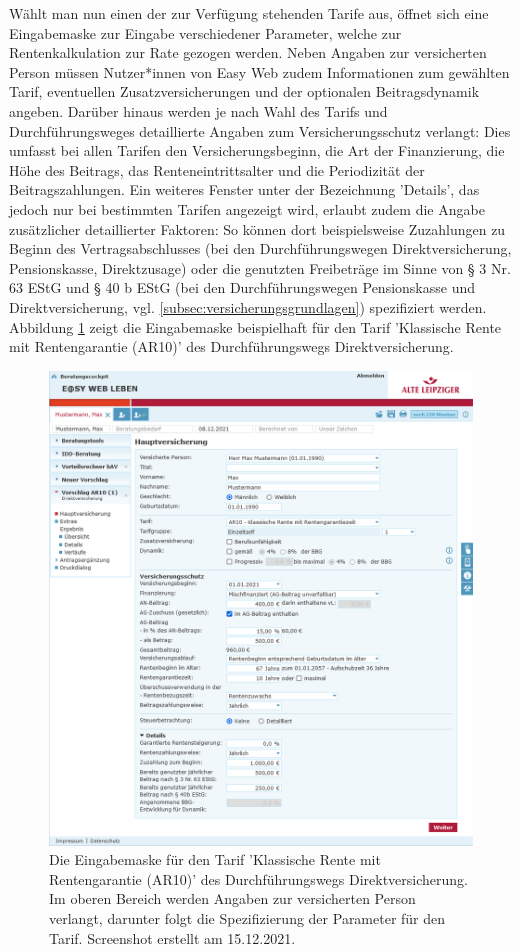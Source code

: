 Wählt man nun einen der zur Verfügung stehenden Tarife aus, öffnet sich eine Eingabemaske zur Eingabe verschiedener Parameter, welche zur Rentenkalkulation zur Rate gezogen werden. Neben Angaben zur versicherten Person müssen Nutzer*innen von Easy Web zudem Informationen zum gewählten Tarif, eventuellen Zusatzversicherungen und der optionalen Beitragsdynamik angeben. Darüber hinaus werden je nach Wahl des Tarifs und Durchführungsweges detaillierte Angaben zum Versicherungsschutz verlangt: Dies umfasst bei allen Tarifen den Versicherungsbeginn, die Art der Finanzierung, die Höhe des Beitrags, das Renteneintrittsalter und die Periodizität der Beitragszahlungen. Ein weiteres Fenster unter der Bezeichnung 'Details', das jedoch nur bei bestimmten Tarifen angezeigt wird, erlaubt zudem die Angabe zusätzlicher detaillierter Faktoren: So können dort beispielsweise Zuzahlungen zu Beginn des Vertragsabschlusses (bei den Durchführungswegen Direktversicherung, Pensionskasse, Direktzusage) oder die genutzten Freibeträge im Sinne von § 3 Nr. 63 EStG und § 40 b EStG (bei den Durchführungswegen Pensionskasse und Direktversicherung, vgl. \autoref{subsec:versicherungsgrundlagen}) spezifiziert werden. Abbildung \ref{fig:easyWebEingabe} zeigt die Eingabemaske beispielhaft für den Tarif 'Klassische Rente mit Rentengarantie (AR10)' des Durchführungswegs Direktversicherung.

\begin{figure}
\centering
\includegraphics[width=0.72\columnwidth]{images/Easy_Web_Eingabe.png}
\caption{Die Eingabemaske für den Tarif 'Klassische Rente mit Rentengarantie (AR10)' des Durchführungswegs Direktversicherung. Im oberen Bereich werden Angaben zur versicherten Person verlangt, darunter folgt die Spezifizierung der Parameter für den Tarif. Screenshot erstellt am 15.12.2021.}
\label{fig:easyWebEingabe}
\end{figure}

